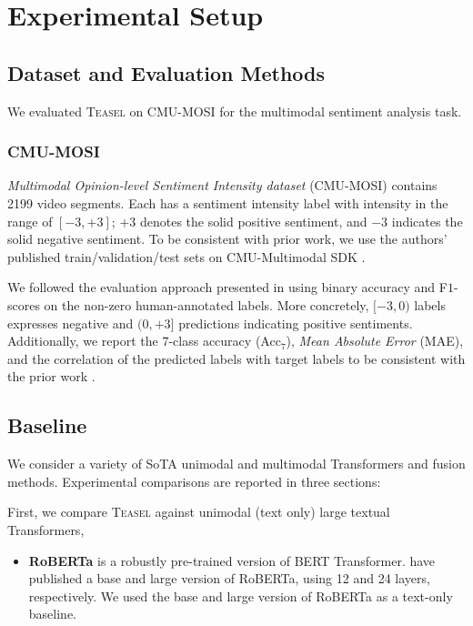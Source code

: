 \documentclass[letterpaper]{article} \usepackage{spconf,amsmath,graphicx}
\newcommand{\teasel}{\textsc{Teasel }}
\begin{document}
\section{Experimental Setup}
\label{sec:experimental setup}


\subsection{Dataset and Evaluation Methods}
We evaluated \teasel on CMU-MOSI \cite{zadeh2016mosi} for the multimodal sentiment analysis task.



\subsubsection{CMU-MOSI} 
\textit{Multimodal Opinion-level Sentiment Intensity dataset} (CMU-MOSI) \cite{zadeh2016mosi} contains 2199 video segments. Each has a sentiment intensity label with intensity in the range of $[-3, +3]$;  $+3$ denotes the solid positive sentiment, and $-3$ indicates the solid negative sentiment. To be consistent with prior work, we use the authors' published train/validation/test sets on CMU-Multimodal SDK \cite{zadeh2018multi}. 







We followed the evaluation approach presented in \cite{tsai2019MULT} using binary accuracy and F$1$-scores on the non-zero human-annotated labels. More concretely, $[-3, 0)$ labels expresses negative and $(0, +3]$ predictions indicating positive sentiments. Additionally, we report the $7$-class accuracy (Acc$_{7}$), \textit{Mean Absolute Error} (MAE), and the correlation of the predicted labels with target labels to be consistent with the prior work \cite{zadeh2017tensor, liu2018efficient, tsai2018learning}.




\subsection{Baseline}
\label{ssec:baseline}

We consider a variety of SoTA unimodal and multimodal Transformers and fusion methods.
Experimental comparisons are reported in three sections:

First, we compare \teasel against unimodal (text only) large textual Transformers,

\begin{itemize}
    \item \textbf{RoBERTa}
    \cite{liu2019roberta} is a robustly pre-trained version of BERT Transformer. \cite{liu2019roberta} have published a base and large version of RoBERTa, using 12 and 24 layers, respectively. We used the base and large version of RoBERTa as a text-only baseline.
\end{itemize}
\end{document}
